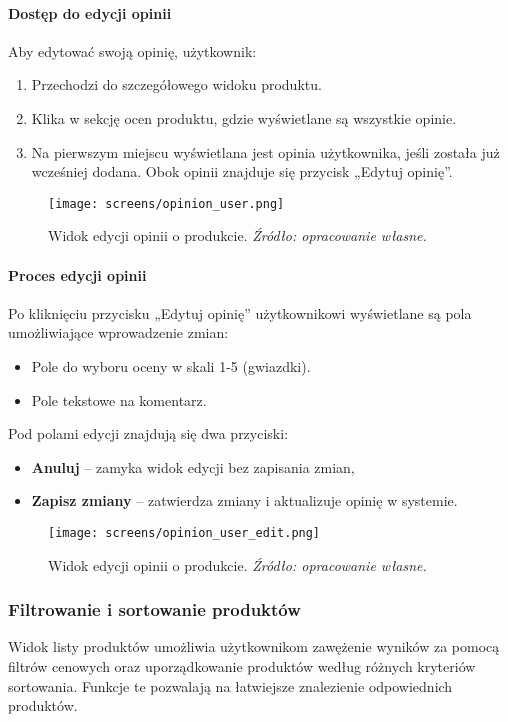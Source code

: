\documentclass[12pt,a4paper,oneside]{article}
\theoremstyle{definition}
\numberwithin{equation}{section}
\begin{document}
\paragraph{Dostęp do edycji opinii}
Aby edytować swoją opinię, użytkownik:
\begin{enumerate}
    \item Przechodzi do szczegółowego widoku produktu.
    \item Klika w sekcję ocen produktu, gdzie wyświetlane są wszystkie opinie.
    \item Na pierwszym miejscu wyświetlana jest opinia użytkownika, jeśli została już wcześniej dodana. Obok opinii znajduje się przycisk „Edytuj opinię”.
\end{enumerate}
\begin{figure}[H]
    \centering
    \texttt{[image: screens/opinion\_user.png]}
    \caption{Widok edycji opinii o produkcie. \emph{Źródło: opracowanie własne.}}
    \label{fig:opinion_user}
\end{figure}
\paragraph{Proces edycji opinii}
Po kliknięciu przycisku „Edytuj opinię” użytkownikowi wyświetlane są pola umożliwiające wprowadzenie zmian:
\begin{itemize}
    \item Pole do wyboru oceny w skali 1-5 (gwiazdki).
    \item Pole tekstowe na komentarz.
\end{itemize}
Pod polami edycji znajdują się dwa przyciski:
\begin{itemize}
    \item \textbf{Anuluj} – zamyka widok edycji bez zapisania zmian,
    \item \textbf{Zapisz zmiany} – zatwierdza zmiany i aktualizuje opinię w systemie.
\end{itemize}

\begin{figure}[H]
    \centering
    \texttt{[image: screens/opinion\_user\_edit.png]}
    \caption{Widok edycji opinii o produkcie. \emph{Źródło: opracowanie własne.}}
    \label{fig:opinion_user_edit}
\end{figure}




\subsubsection{Filtrowanie i sortowanie produktów}
Widok listy produktów umożliwia użytkownikom zawężenie wyników za pomocą filtrów cenowych oraz uporządkowanie produktów według różnych kryteriów sortowania. Funkcje te pozwalają na łatwiejsze znalezienie odpowiednich produktów.
\end{document}
